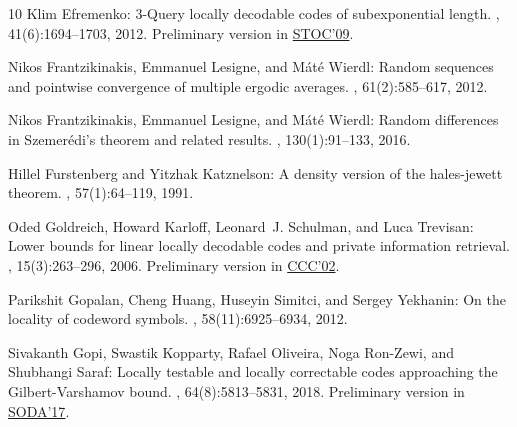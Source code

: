 \documentclass[11pt]{article}
\numberwithin{equation}{section}
\theoremstyle{definition}
\theoremstyle{plain}
\begin{document}
\begin{thebibliography}{10}
{\sc Klim Efremenko}: 3-{Q}uery locally decodable codes of subexponential
  length.
, 41(6):1694--1703, 2012.
\newblock Preliminary version in
  \href{https://dl.acm.org/citation.cfm?id=1536422}{STOC'09}.
\newblock [\epfmtdoi{10.1137/090772721}]

{\sc Nikos Frantzikinakis, Emmanuel Lesigne, and M\'{a}t\'{e} Wierdl}: Random
  sequences and pointwise convergence of multiple ergodic averages.
, 61(2):585--617, 2012.

{\sc Nikos Frantzikinakis, Emmanuel Lesigne, and M\'{a}t\'{e} Wierdl}: Random
  differences in {S}zemer\'{e}di's theorem and related results.
, 130(1):91--133, 2016.

{\sc Hillel Furstenberg and Yitzhak Katznelson}: A density version of the
  hales-jewett theorem.
, 57(1):64--119, 1991.
\newblock [\epfmtdoi{10.1007/BF03041066}]

{\sc Oded Goldreich, Howard Karloff, Leonard~J. Schulman, and Luca Trevisan}:
  Lower bounds for linear locally decodable codes and private information
  retrieval.
, 15(3):263--296, 2006.
\newblock Preliminary version in
  \href{https://ieeexplore.ieee.org/document/1004353}{CCC'02}.
\newblock [\epfmtdoi{10.1007/s00037-006-0216-3}]

{\sc Parikshit Gopalan, Cheng Huang, Huseyin Simitci, and Sergey Yekhanin}: On
  the locality of codeword symbols.
, 58(11):6925--6934, 2012.

{\sc Sivakanth Gopi, Swastik Kopparty, Rafael Oliveira, Noga Ron-Zewi, and
  Shubhangi Saraf}: Locally testable and locally correctable codes approaching
  the {G}ilbert-{V}arshamov bound.
, 64(8):5813--5831, 2018.
\newblock Preliminary version in
  \href{https://dl.acm.org/citation.cfm?id=3039821}{SODA'17}.


\end{thebibliography}
\end{document}
